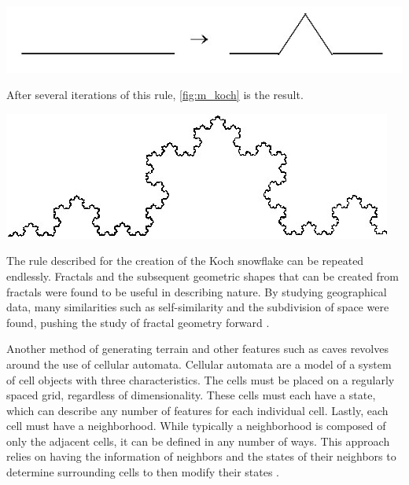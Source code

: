 \documentclass[10pt]{report}
\begin{document}
		\begin{minipage}{\textwidth}
			\centering
			\includegraphics[scale=0.5]{m_reprule}
			\label{fig:m_reprule}
		\end{minipage}
		
		After several iterations of this rule, \autoref{fig:m_koch} is the result.
		
		\begin{minipage}{\textwidth}
			\centering
			\includegraphics[scale=0.5]{m_koch}
			\label{fig:m_koch}
		\end{minipage}
	
		The rule described for the creation of the Koch snowflake can be repeated endlessly. Fractals and the subsequent geometric shapes that can be created from fractals were found to be useful in describing nature. By studying geographical data, many similarities such as self-similarity and the subdivision of space were found, pushing the study of fractal geometry forward \cite{doi:10.1111/j.1467-8306.1987.tb00158.x}. 
		
		Another method of generating terrain and other features such as caves \cite{10.1145/1814256.1814266} revolves around the use of cellular automata. Cellular automata are a model of a system of cell objects with three characteristics. The cells must be placed on a regularly spaced grid, regardless of dimensionality. These cells must each have a state, which can describe any number of features for each individual cell. Lastly, each cell must have a neighborhood. While typically a neighborhood is composed of only the adjacent cells, it can be defined in any number of ways. This approach relies on having the information of neighbors and the states of their neighbors to determine surrounding cells to then modify their states \cite{nature-of-code}. 
		
\end{document}

